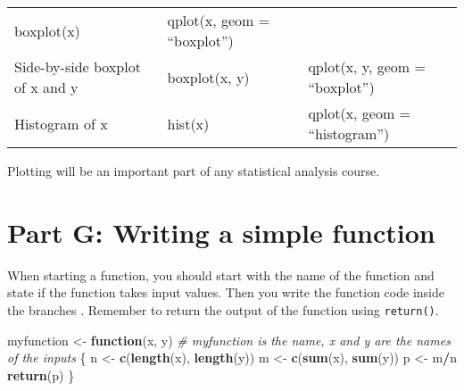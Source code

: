 \documentclass[]{article}
\newenvironment{Shaded}{\begin{snugshade}}{\end{snugshade}}
\newcommand{\KeywordTok}[1]{\textcolor[rgb]{0.13,0.29,0.53}{\textbf{#1}}}
\newcommand{\StringTok}[1]{\textcolor[rgb]{0.31,0.60,0.02}{#1}}
\newcommand{\CommentTok}[1]{\textcolor[rgb]{0.56,0.35,0.01}{\textit{#1}}}
\newcommand{\ControlFlowTok}[1]{\textcolor[rgb]{0.13,0.29,0.53}{\textbf{#1}}}
\newcommand{\OperatorTok}[1]{\textcolor[rgb]{0.81,0.36,0.00}{\textbf{#1}}}
\newcommand{\NormalTok}[1]{#1}
\begin{document}
\begin{longtable}[]{@{}lll@{}}
\begin{minipage}[t]{0.25\columnwidth}
boxplot(x)\strut
\end{minipage} & \begin{minipage}[t]{0.25\columnwidth}\raggedright\strut
qplot(x, geom = ``boxplot'')\strut
\end{minipage}\tabularnewline
\begin{minipage}[t]{0.41\columnwidth}\raggedright\strut
Side-by-side boxplot of x and y\strut
\end{minipage} & \begin{minipage}[t]{0.25\columnwidth}\raggedright\strut
boxplot(x, y)\strut
\end{minipage} & \begin{minipage}[t]{0.25\columnwidth}\raggedright\strut
qplot(x, y, geom = ``boxplot'')\strut
\end{minipage}\tabularnewline
\begin{minipage}[t]{0.41\columnwidth}\raggedright\strut
Histogram of x\strut
\end{minipage} & \begin{minipage}[t]{0.25\columnwidth}\raggedright\strut
hist(x)\strut
\end{minipage} & \begin{minipage}[t]{0.25\columnwidth}\raggedright\strut
qplot(x, geom = ``histogram'')\strut
\end{minipage}\tabularnewline
\bottomrule
\end{longtable}

Plotting will be an important part of any statistical analysis course.

\section{Part G: Writing a simple
function}\label{part-g-writing-a-simple-function}

When starting a function, you should start with the name of the function
and state if the function takes input values. Then you write the
function code inside the branches \({}\). Remember to return the output
of the function using \texttt{return()}.

\begin{Shaded}
\begin{Highlighting}[]
\NormalTok{myfunction <-}\StringTok{ }\ControlFlowTok{function}\NormalTok{(x, y) }\CommentTok{# myfunction is the name, x and y are the names of the inputs}
\NormalTok{\{}
\NormalTok{    n <-}\StringTok{ }\KeywordTok{c}\NormalTok{(}\KeywordTok{length}\NormalTok{(x), }\KeywordTok{length}\NormalTok{(y))}
\NormalTok{    m <-}\StringTok{ }\KeywordTok{c}\NormalTok{(}\KeywordTok{sum}\NormalTok{(x), }\KeywordTok{sum}\NormalTok{(y))}
\NormalTok{    p <-}\StringTok{ }\NormalTok{m}\OperatorTok{/}\NormalTok{n}
    \KeywordTok{return}\NormalTok{(p)}
\NormalTok{\}}
\end{Highlighting}
\end{Shaded}
\end{document}
